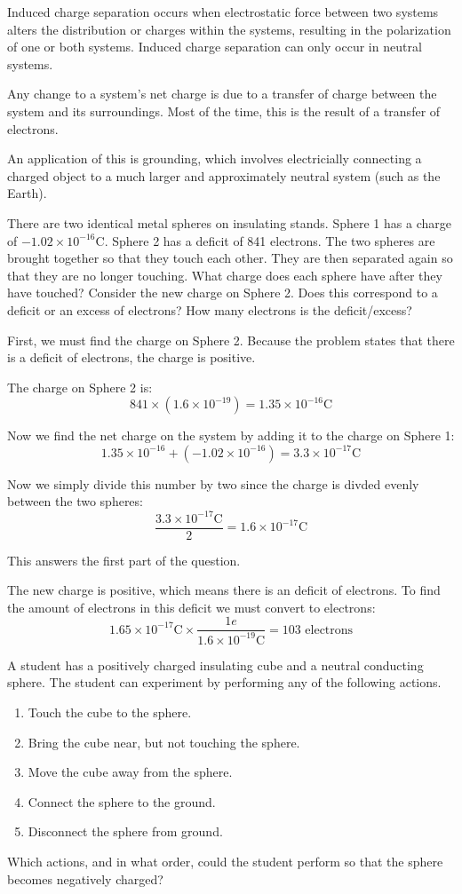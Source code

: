 \documentclass[../em.tex]{subfiles}
\begin{document}
Induced charge separation occurs when electrostatic force between two systems 
alters the distribution or charges within the systems, resulting in the polarization of 
one or both systems. Induced charge separation can only occur in neutral systems.

Any change to a system's net charge is due to a transfer of charge between the 
system and its surroundings. Most of the time, this is the result of a transfer of electrons.

An application of this is grounding, which involves electricially connecting 
a charged object to a much larger and approximately neutral system (such as the Earth).

\pagebreak
\begin{example}
    There are two identical metal spheres on insulating stands. Sphere 1 has a charge of $-1.02 \times 10^{-16}$C. 
    Sphere 2 has a deficit of 841 electrons. The two spheres are brought together so that they touch each other. 
    They are then separated again so that they are no longer touching. What charge does each sphere have after 
    they have touched? Consider the new charge on Sphere 2. Does this correspond to a deficit or an excess of 
    electrons? How many electrons is the deficit/excess?

    First, we must find the charge on Sphere 2. Because the problem states that there is a deficit of electrons, the charge is positive.
    
    The charge on Sphere 2 is:
    \[841 \times (1.6\times 10^{-19}) = 1.35\times 10^{-16}\text{C}\]

    Now we find the net charge on the system by adding it to the charge on Sphere 1:
    \[1.35 \times 10^{-16} + (-1.02 \times 10^{-16}) = 3.3\times 10^{-17}\text{C}\]

    Now we simply divide this number by two since the charge is divded evenly between the two spheres:
    \[\frac{3.3\times 10^{-17}\text{C}}{2}=1.6\times 10^{-17}\text{C}\]
    
    This answers the first part of the question.

    The new charge is positive, which means there is an deficit of electrons. 
    To find the amount of electrons in this deficit we must convert to electrons:
    \[1.65\times10^{-17}\text{C}\times \frac{1e}{1.6\times10^{-19}\text{C}}=103\text{ electrons}\]
\end{example}

\ex A student has a positively charged insulating cube and a neutral conducting sphere. The student can experiment by performing any of the following actions.
\begin{enumerate}
    \item Touch the cube to the sphere.
    \item Bring the cube near, but not touching the sphere.
    \item Move the cube away from the sphere.
    \item Connect the sphere to the ground.
    \item Disconnect the sphere from ground.
\end{enumerate}
Which actions, and in what order, could the student perform so that the sphere becomes negatively charged?
\end{document}

